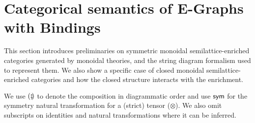 \section{Categorical semantics of E-Graphs with Bindings}%
\label{sec:categorical}

This section introduces preliminaries on symmetric monoidal semilattice-enriched categories generated by monoidal theories, and the string diagram formalism used to represent them.
We also show a specific case of closed monoidal semilattice-enriched categories and how the closed structure interacts with the enrichment.

We use $(\fatsemi\!)$ to denote the composition in diagrammatic order and use $\textsf{sym}$ for the symmetry natural transformation for a (strict) tensor ($\otimes$).
We also omit subscripts on identities and natural transformations where it can be inferred.

